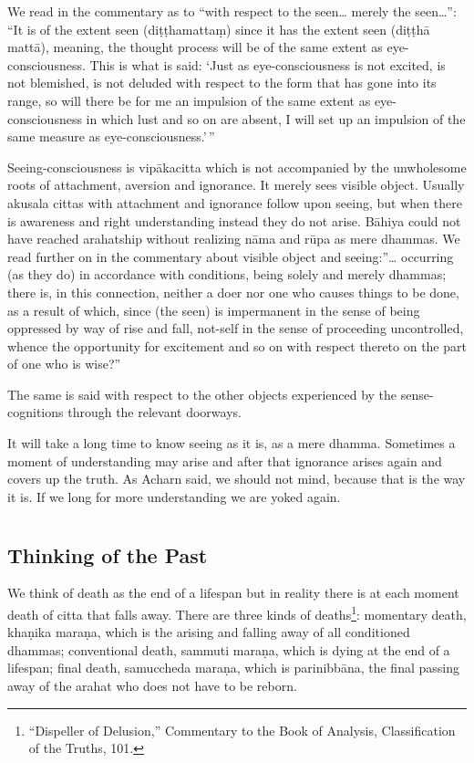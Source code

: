 We read in the commentary as to ``with respect to the seen\ldots{}
merely the seen\ldots{}'': ``It is of the extent seen (diṭṭhamattaṃ)
since it has the extent seen (diṭṭhā mattā), meaning, the thought
process will be of the same extent as eye-consciousness. This is what is
said: `Just as eye-consciousness is not excited, is not blemished, is
not deluded with respect to the form that has gone into its range, so
will there be for me an impulsion of the same extent as
eye-consciousness in which lust and so on are absent, I will set up an
impulsion of the same measure as eye-consciousness.'\,''

Seeing-consciousness is vipākacitta which is not accompanied by the
unwholesome roots of attachment, aversion and ignorance. It merely sees
visible object. Usually akusala cittas with attachment and ignorance
follow upon seeing, but when there is awareness and right understanding
instead they do not arise. Bāhiya could not have reached arahatship
without realizing nāma and rūpa as mere dhammas. We read further on in
the commentary about visible object and seeing:''\ldots{} occurring (as
they do) in accordance with conditions, being solely and merely dhammas;
there is, in this connection, neither a doer nor one who causes things
to be done, as a result of which, since (the seen) is impermanent in the
sense of being oppressed by way of rise and fall, not-self in the sense
of proceeding uncontrolled, whence the opportunity for excitement and so
on with respect thereto on the part of one who is wise?''

The same is said with respect to the other objects experienced by the
sense-cognitions through the relevant doorways.

It will take a long time to know seeing as it is, as a mere dhamma.
Sometimes a moment of understanding may arise and after that ignorance
arises again and covers up the truth. As Acharn said, we should not
mind, because that is the way it is. If we long for more understanding
we are yoked again.



\chapter[Thinking of the Past]{}
\section*{Thinking of the Past}

We think of death as the end of a lifespan but in reality there is at
each moment death of citta that falls away. There are three kinds of
deaths\footnote{``Dispeller of
Delusion,'' Commentary to the Book of Analysis, Classification of the
Truths, 101.
}: momentary
death, khaṇika maraṇa, which is the arising and falling away of all
conditioned dhammas; conventional death, sammuti maraṇa, which is dying
at the end of a lifespan; final death, samuccheda maraṇa, which is
parinibbāna, the final passing away of the arahat who does not have to
be reborn.

